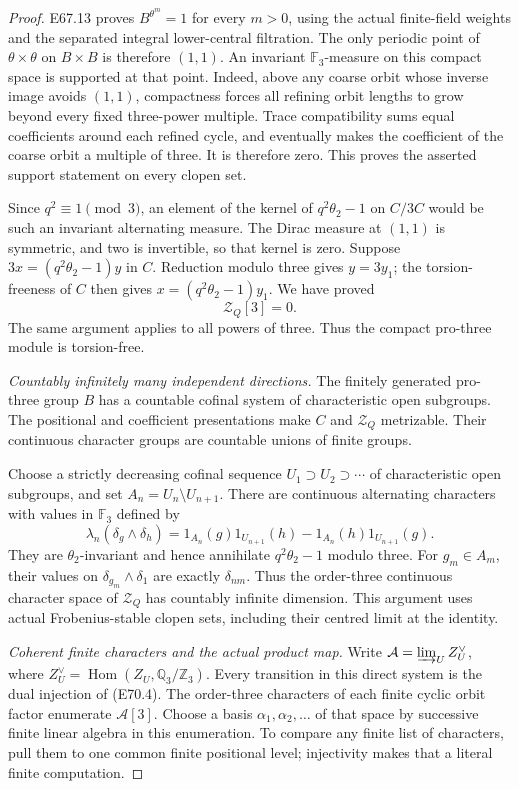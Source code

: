 \begin{proof}
E67.13 proves $B^{\theta^m}=1$ for every $m>0$,
using the actual finite-field weights and the
separated integral lower-central filtration.
The only periodic point of $\theta\times\theta$
on $B\times B$ is therefore $(1,1)$.
An invariant $\mathbb F_3$-measure on this compact
space is supported at that point. Indeed, above
any coarse orbit whose inverse image avoids
$(1,1)$, compactness forces all refining orbit
lengths to grow beyond every fixed three-power
multiple. Trace compatibility sums equal
coefficients around each refined cycle, and
eventually makes the coefficient of the coarse
orbit a multiple of three. It is therefore zero.
This proves the asserted support statement on
every clopen set.

Since $q^2\equiv1\pmod3$, an element of the kernel
of $q^2\theta_2-1$ on $C/3C$ would be such an
invariant alternating measure. The Dirac measure
at $(1,1)$ is symmetric, and two is invertible,
so that kernel is zero.
Suppose $3x=(q^2\theta_2-1)y$ in $C$.
Reduction modulo three gives $y=3y_1$; the
torsion-freeness of $C$ then gives
$x=(q^2\theta_2-1)y_1$.
We have proved
\[
                         \mathcal Z_Q[3]=0.
 \tag{E70.9}
\]
The same argument applies to all powers of three.
Thus the compact pro-three module is torsion-free.

\emph{Countably infinitely many independent directions.}
The finitely generated pro-three group $B$ has
a countable cofinal system of characteristic open
subgroups. The positional and coefficient
presentations make $C$ and $\mathcal Z_Q$
metrizable. Their continuous character groups
are countable unions of finite groups.

Choose a strictly decreasing cofinal sequence
$U_1\supset U_2\supset\cdots$ of characteristic
open subgroups, and set $A_n=U_n\setminus U_{n+1}$.
There are continuous alternating characters
with values in $\mathbb F_3$ defined by
\[
 \lambda_n(\delta_g\wedge\delta_h)=
       1_{A_n}(g)1_{U_{n+1}}(h)
           -1_{A_n}(h)1_{U_{n+1}}(g).
 \tag{E70.10}
\]
They are $\theta_2$-invariant and hence annihilate
$q^2\theta_2-1$ modulo three.
For $g_m\in A_m$, their values on
$\delta_{g_m}\wedge\delta_1$ are exactly
$\delta_{nm}$.
Thus the order-three continuous character
space of $\mathcal Z_Q$ has countably infinite
dimension. This argument uses actual
Frobenius-stable clopen sets, including their
centred limit at the identity.

\emph{Coherent finite characters and the actual product map.}
Write $\mathcal A=\varinjlim_U Z_U^\vee$, where
$Z_U^\vee=\operatorname{Hom}(Z_U,\mathbb Q_3/\mathbb Z_3)$.
Every transition in this direct system is the
dual injection of (E70.4).
The order-three characters of each finite cyclic
orbit factor enumerate $\mathcal A[3]$.
Choose a basis $\alpha_1,\alpha_2,\ldots$ of that
space by successive finite linear algebra in this
enumeration. To compare any finite list of
characters, pull them to one common finite
positional level; injectivity makes that a
literal finite computation.


\end{proof}
